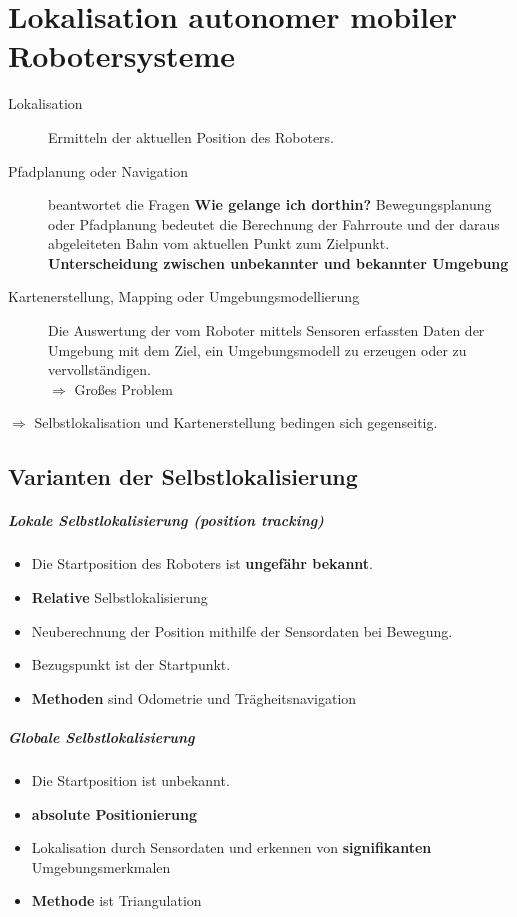 \chapter{Lokalisation autonomer mobiler Robotersysteme}
\begin{description}
	\item[Lokalisation] Ermitteln der aktuellen Position des Roboters.
	\item[Pfadplanung oder Navigation] beantwortet die Fragen \textbf{Wie
		gelange ich dorthin?} Bewegungsplanung oder Pfadplanung bedeutet die
		Berechnung der Fahrroute und der daraus abgeleiteten Bahn vom aktuellen
		Punkt zum Zielpunkt. \\
		\textbf{Unterscheidung zwischen unbekannter und bekannter Umgebung}
	\item[Kartenerstellung, Mapping oder Umgebungsmodellierung] Die Auswertung
		der vom Roboter mittels Sensoren erfassten Daten der Umgebung mit dem
		Ziel, ein Umgebungsmodell zu erzeugen oder zu vervollständigen. \\
		$\Rightarrow$ Großes Problem
\end{description}

$\Rightarrow$ Selbstlokalisation und Kartenerstellung bedingen sich
gegenseitig.

\section{Varianten der Selbstlokalisierung}
\paragraph{Lokale Selbstlokalisierung (position tracking)}
\begin{itemize}
	\item Die Startposition des Roboters ist \textbf{ungefähr bekannt}.
	\item \textbf{Relative} Selbstlokalisierung
	\item Neuberechnung der Position mithilfe der Sensordaten bei Bewegung.
	\item Bezugspunkt ist der Startpunkt.
	\item \textbf{Methoden} sind Odometrie und Trägheitsnavigation
\end{itemize}

\paragraph{Globale Selbstlokalisierung}
\begin{itemize}
	\item Die Startposition ist unbekannt.
	\item \textbf{absolute Positionierung}
	\item Lokalisation durch Sensordaten und erkennen von \textbf{signifikanten}
		Umgebungsmerkmalen
	\item \textbf{Methode} ist Triangulation
\end{itemize}

